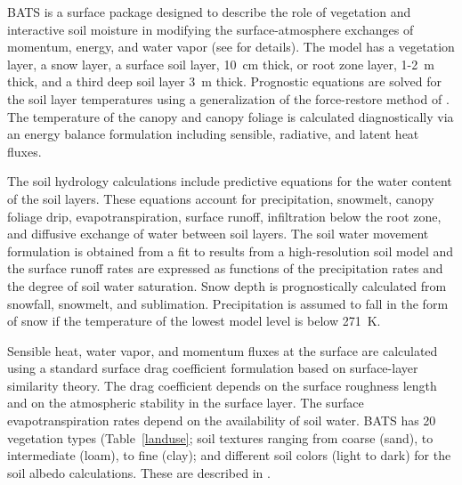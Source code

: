  BATS is a surface package designed to describe
the role of vegetation and interactive soil moisture in modifying the
surface-atmosphere exchanges of momentum, energy, and water vapor (see
\cite{Dickinson_93} for details).  The model has a vegetation layer, a snow
layer, a surface soil layer, 10~cm thick, or root zone layer, 1-2~m thick, and a
third deep soil layer 3~m thick.  Prognostic equations are solved for the soil
layer temperatures using a generalization of the force-restore method of
\cite{Deardoff_78}.  The temperature of the canopy and canopy foliage is
calculated diagnostically via an energy balance formulation including sensible,
radiative, and latent heat fluxes.

The soil hydrology calculations include predictive equations for the water
content of the soil layers.  These equations account for precipitation,
snowmelt, canopy foliage drip, evapotranspiration, surface runoff, infiltration
below the root zone, and diffusive exchange of water between soil layers.  The
soil water movement formulation is obtained from a fit to results from a
high-resolution soil model \cite{Dickinson_84} and the surface runoff rates are
expressed as functions of the precipitation rates and the degree of soil water
saturation.  Snow depth is prognostically calculated from snowfall, snowmelt,
and sublimation.  Precipitation is assumed to fall in the form of snow if the
temperature of the lowest model level is below 271~K.

Sensible heat, water vapor, and momentum fluxes at the surface are calculated
using a standard surface drag coefficient formulation based on surface-layer
similarity theory.  The drag coefficient depends on the surface roughness length
and on the atmospheric stability in the surface layer.  The surface
evapotranspiration rates depend on the availability of soil water.  \ac{BATS}
has 20 vegetation types (Table~\ref{landuse};  soil textures ranging from coarse
(sand), to intermediate (loam), to fine (clay);  and different soil colors
(light to dark) for the soil albedo calculations.  These are described in
\cite{Dickinson_86}. 

